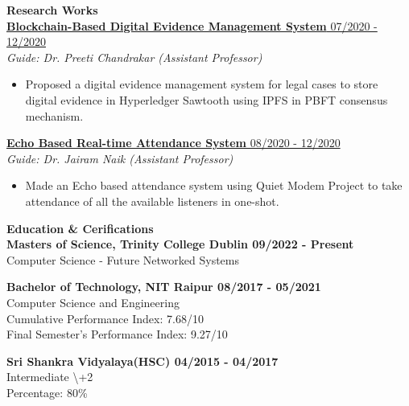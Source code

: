 \documentclass{article}
\begin{document}
\noindent \large \textbf{\textcolor{NavyBlue}{Research Works}} \vspace{5pt} \\
\noindent \normalsize \href{https://link.springer.com/content/pdf/10.1007/978-3-030-82469-3_30}{\textbf{Blockchain-Based Digital Evidence Management System } \hfill 07/2020 - 12/2020} \\
\textit{Guide: Dr. Preeti Chandrakar (Assistant Professor)} \hfill
\begin{itemize}
    \item Proposed a digital evidence management system for legal cases to store digital evidence in Hyperledger Sawtooth using IPFS in PBFT consensus mechanism.
\end{itemize}

\noindent \normalsize \href{https://dx.doi.org/10.1504/ijiids.2022.10044370}{\textbf{Echo Based Real-time Attendance System} \hfill 08/2020 - 12/2020} \\
\textit{Guide: Dr. Jairam Naik (Assistant Professor)}
\begin{itemize}
    \item  Made an Echo based attendance system using Quiet Modem Project to take attendance of all
the available listeners in one-shot.
\end{itemize}
\noindent \large \textbf{\textcolor{NavyBlue}{Education \& Cerifications}} \vspace{5pt} \\
\normalsize \textbf{Masters of Science, Trinity College Dublin \hfill 09/2022 - Present}\\
Computer Science - Future Networked Systems
\vspace{5pt}

\noindent \normalsize \textbf{Bachelor of Technology, NIT Raipur \hfill 08/2017 - 05/2021}\\
Computer Science and Engineering \\
Cumulative Performance Index: 7.68/10 \\
Final Semester's Performance Index: 9.27/10
\vspace{5pt}

\noindent \normalsize \textbf{Sri Shankra Vidyalaya(HSC) \hfill 04/2015 - 04/2017}\\
Intermediate \textbackslash+2 \\
Percentage: 80\% \\
\end{document}
